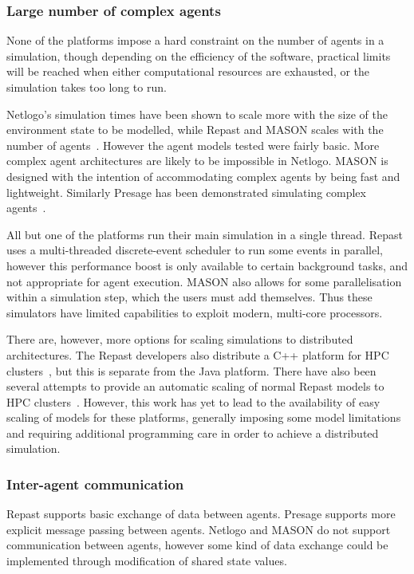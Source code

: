 \subsubsection*{Large number of complex agents}

None of the platforms impose a hard constraint on the number of agents in a simulation, though depending on the efficiency of the software, practical limits will be reached when either computational resources are exhausted, or the simulation takes too long to run.

Netlogo's simulation times have been shown to scale more with the size of the environment state to be modelled, while Repast and MASON scales with the number of agents~\citep{Railsback2006}.  However the agent models tested were fairly basic. More complex agent architectures are likely to be impossible in Netlogo. MASON is designed with the intention of accommodating complex agents by being fast and lightweight. Similarly Presage has been demonstrated simulating complex agents~\citep{Pitt2011}.

All but one of the platforms run their main simulation in a single thread. Repast uses a multi-threaded discrete-event scheduler to run some events in parallel, however this performance boost is only available to certain background tasks, and not appropriate for agent execution. MASON also allows for some parallelisation within a simulation step, which the users must add themselves. Thus these simulators have limited capabilities to exploit modern, multi-core processors.

There are, however, more options for scaling simulations to distributed architectures. The Repast developers also distribute a C++ platform for \ac{HPC} clusters~\citep{Collier2013}, but this is separate from the Java platform. There have also been several attempts to provide an automatic scaling of normal Repast models to \ac{HPC} clusters~\citep{Minson2008,Cicirelli2011}.
However, this work has yet to lead to the availability of easy scaling of models for these platforms, generally imposing some model limitations and requiring additional programming care in order to achieve a distributed simulation.

\subsubsection*{Inter-agent communication}

Repast supports basic exchange of data between agents. Presage supports more explicit message passing between agents. Netlogo and MASON do not support communication between agents, however some kind of data exchange could be implemented through modification of shared state values.

